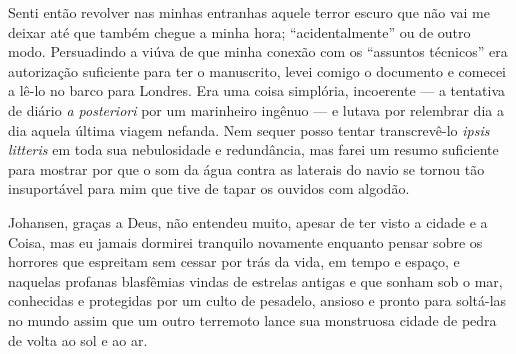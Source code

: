 Senti então revolver nas minhas entranhas aquele terror escuro que não
vai me deixar até que também chegue a minha hora; ``acidentalmente'' ou
de outro modo. Persuadindo a viúva de que minha conexão com os
``assuntos técnicos'' era autorização suficiente para ter o manuscrito,
levei comigo o documento e comecei a lê-lo no barco para Londres. Era
uma coisa simplória, incoerente --- a tentativa de diário \emph{a
posteriori} por um marinheiro ingênuo --- e lutava por relembrar
dia a dia aquela última viagem nefanda. Nem sequer posso tentar
transcrevê-lo \emph{ipsis litteris} em toda sua nebulosidade e
redundância, mas farei um resumo suficiente para mostrar por que o som
da água contra as laterais do navio se tornou tão insuportável para mim
que tive de tapar os ouvidos com algodão.

Johansen, graças a Deus, não entendeu muito, apesar de ter visto a
cidade e a Coisa, mas eu jamais dormirei tranquilo novamente enquanto
pensar sobre os horrores que espreitam sem cessar por trás da vida, em
tempo e espaço, e naquelas profanas blasfêmias vindas de estrelas
antigas e que sonham sob o mar, conhecidas e protegidas por um culto de
pesadelo, ansioso e pronto para soltá-las no mundo assim que um outro
terremoto lance sua monstruosa cidade de pedra de volta ao sol e ao ar.

